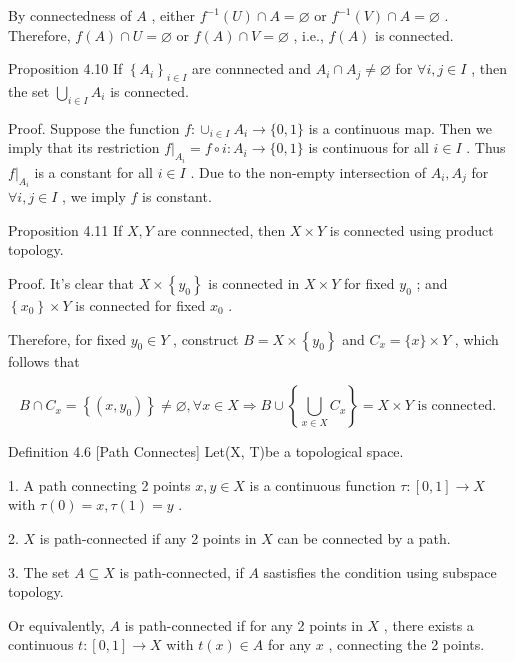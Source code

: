 By connectedness of \(A\) , either \({f}^{-1}\left( U\right)  \cap  A = \varnothing\) or \({f}^{-1}\left( V\right)  \cap  A = \varnothing\) . Therefore, \(f\left( A\right)  \cap  U = \varnothing\) or \(f\left( A\right)  \cap  V = \varnothing\) , i.e., \(f\left( A\right)\) is connected.

Proposition 4.10 If \({\left\{  {A}_{i}\right\}  }_{i \in  I}\) are connnected and \({A}_{i} \cap  {A}_{j} \neq  \varnothing\) for \(\forall i,j \in  I\) , then the set \(\mathop{\bigcup }\limits_{{i \in  I}}{A}_{i}\) is connected.

Proof. Suppose the function \(f : { \cup  }_{i \in  I}{A}_{i} \rightarrow  \{ 0,1\}\) is a continuous map. Then we imply that its restriction \({\left. f\right| }_{{A}_{i}} = f \circ  i : {A}_{i} \rightarrow  \{ 0,1\}\) is continuous for all \(i \in  I\) . Thus \({\left. f\right| }_{{A}_{i}}\) is a constant for all \(i \in  I\) . Due to the non-empty intersection of \({A}_{i},{A}_{j}\) for \(\forall i,j \in  I\) , we imply \(f\) is constant.

Proposition 4.11 If \(X,Y\) are connnected, then \(X \times  Y\) is connected using product topology.

Proof. It’s clear that \(X \times  \left\{  {y}_{0}\right\}\) is connected in \(X \times  Y\) for fixed \({y}_{0}\) ; and \(\left\{  {x}_{0}\right\}   \times  Y\) is connected for fixed \({x}_{0}\) .

Therefore, for fixed \({y}_{0} \in  Y\) , construct \(B = X \times  \left\{  {y}_{0}\right\}\) and \({C}_{x} = \{ x\}  \times  Y\) , which follows that

\[
B \cap  {C}_{x} = \left\{  \left( {x,{y}_{0}}\right) \right\}   \neq  \varnothing ,\forall x \in  X \Rightarrow  B \cup  \left\{  {\mathop{\bigcup }\limits_{{x \in  X}}{C}_{x}}\right\}   = X \times  Y\text{ is connected. }
\]

Definition 4.6 [Path Connectes] Let(X, T)be a topological space.

1. A path connecting 2 points \(x,y \in  X\) is a continuous function \(\tau  : \left\lbrack  {0,1}\right\rbrack   \rightarrow  X\) with \(\tau \left( 0\right)  = x,\tau \left( 1\right)  = y\) .

2. \(X\) is path-connected if any 2 points in \(X\) can be connected by a path.

3. The set \(A \subseteq  X\) is path-connected, if \(A\) sastisfies the condition using subspace topology.

Or equivalently, \(A\) is path-connected if for any 2 points in \(X\) , there exists a continuous \(t : \left\lbrack  {0,1}\right\rbrack   \rightarrow  X\) with \(t\left( x\right)  \in  A\) for any \(x\) , connecting the 2 points.


